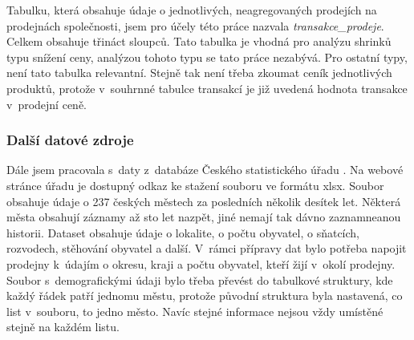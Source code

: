 Tabulku, která obsahuje údaje o jednotlivých, neagregovaných prodejích na prodejnách společnosti, jsem pro účely této práce nazvala \emph{transakce\_prodeje}. Celkem obsahuje třináct sloupců. Tato tabulka je vhodná pro analýzu shrinků typu snížení ceny, analýzou tohoto typu se tato práce nezabývá. Pro ostatní typy, není tato tabulka relevantní. Stejně tak není třeba zkoumat ceník jednotlivých produktů, protože v~souhrnné tabulce transakcí je již uvedená hodnota transakce v~prodejní ceně.

\subsubsection{Další datové zdroje}

Dále jsem pracovala s~daty z~databáze Českého statistického úřadu \cite{bib:czso}. Na webové stránce úřadu je dostupný odkaz ke stažení souboru ve formátu xlsx. Soubor obsahuje údaje o 237 českých městech za posledních několik desítek let. Některá města obsahují záznamy až sto let nazpět, jiné nemají tak dávno zaznamneanou historii. Dataset obsahuje údaje o lokalite, o počtu obyvatel, o sňatcích, rozvodech, stěhování obyvatel a další. V~rámci přípravy dat bylo potřeba napojit prodejny k~údajím o okresu, kraji a počtu obyvatel, kteří žijí v~okolí prodejny. Soubor s~demografickými údaji bylo třeba převést do tabulkové struktury, kde každý řádek patří jednomu městu, protože původní struktura byla nastavená, co list v~souboru, to jedno město. Navíc stejné informace nejsou vždy umístěné stejně na každém listu. 



% 





